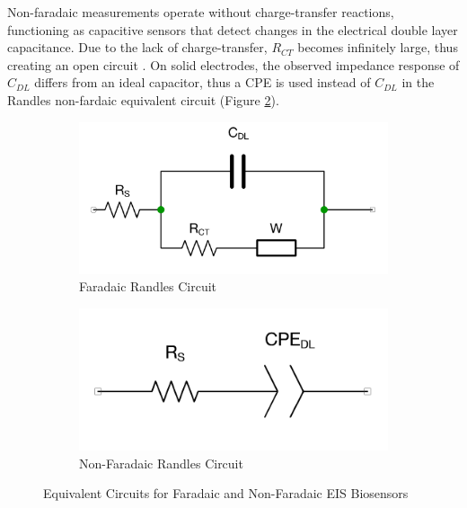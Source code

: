 Non-faradaic measurements operate without charge-transfer reactions, functioning as capacitive sensors that detect changes in the electrical double layer capacitance. Due to the lack of charge-transfer, $R_{CT}$ becomes infinitely large, thus creating an open circuit \cite{xieReviewAdvancementsNanoscale2020a}. On solid electrodes, the observed impedance response of $C_{DL}$ differs from an ideal capacitor, thus a \ac{CPE} is used instead of $C_{DL}$ in the Randles non-fardaic equivalent circuit (Figure \ref{fig:randles_non_faradaic}).  

\begin{figure}[ht]
    \centering
    \begin{subfigure}{0.45\textwidth}
        \centering
        \includegraphics[width=\textwidth]{RandlesFaradaic.png}
        \caption{Faradaic Randles Circuit}
        \label{fig:randles_fardaic}
    \end{subfigure}
    \hfill
    \begin{subfigure}{0.45\textwidth}
        \centering
        \includegraphics[width=\textwidth]{RandlesNonFaradaic.png}
        \caption{Non-Faradaic Randles Circuit}
        \label{fig:randles_non_faradaic}    
    \end{subfigure}
    \caption{Equivalent Circuits for Faradaic and Non-Faradaic EIS Biosensors}
    \label{fig:randles_circuits}
\end{figure}

